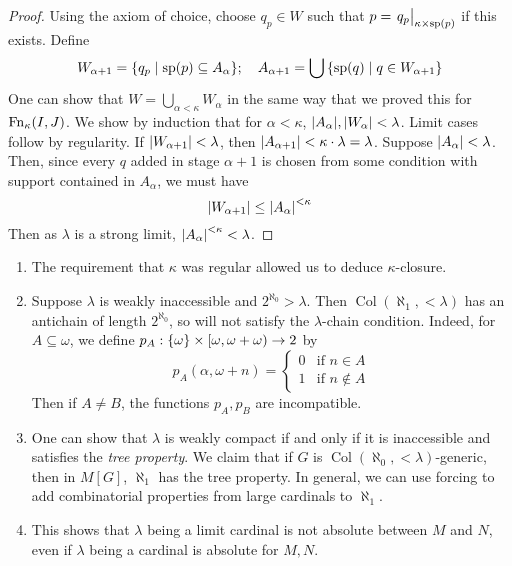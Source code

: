 \begin{proof}
    Using the axiom of choice, choose \( q_p \in W \) such that \( p = \eval{q_p}_{\kappa \times \operatorname{sp}(p)} \) if this exists.
    Define
    \[ W_{\alpha + 1} = \qty{q_p \mid \operatorname{sp}(p) \subseteq A_\alpha};\quad A_{\alpha + 1} = \bigcup\qty{\operatorname{sp}(q) \mid q \in W_{\alpha + 1}} \]
    One can show that \( W = \bigcup_{\alpha < \kappa} W_\alpha \) in the same way that we proved this for \( \operatorname{Fn}_\kappa(I, J) \).
    We show by induction that for \( \alpha < \kappa \), \( \abs{A_\alpha}, \abs{W_\alpha} < \lambda \).
    Limit cases follow by regularity.
    If \( \abs{W_{\alpha + 1}} < \lambda \), then \( \abs{A_{\alpha + 1}} < \kappa \cdot \lambda = \lambda \).
    Suppose \( \abs{A_{\alpha}} < \lambda \).
    Then, since every \( q \) added in stage \( \alpha + 1 \) is chosen from some condition with support contained in \( A_\alpha \), we must have
    \[ \abs{W_{\alpha + 1}} \leq \abs{A_\alpha}^{<\kappa} \]
    Then as \( \lambda \) is a strong limit, \( \abs{A_\alpha}^{<\kappa} < \lambda \).
\end{proof}
\begin{remark}
    \begin{enumerate}
        \item The requirement that \( \kappa \) was regular allowed us to deduce \( \kappa \)-closure.
        \item Suppose \( \lambda \) is weakly inaccessible and \( 2^{\aleph_0} > \lambda \).
        Then \( \operatorname{Col}(\aleph_1, <\lambda) \) has an antichain of length \( 2^{\aleph_0} \), so will not satisfy the \( \lambda \)-chain condition.
        Indeed, for \( A \subseteq \omega \), we define \( p_A : \qty{\omega} \times [\omega, \omega + \omega) \to 2 \) by
        \[ p_A(\alpha, \omega + n) = \begin{cases}
            0 & \text{if } n \in A \\
            1 & \text{if } n \notin A
        \end{cases} \]
        Then if \( A \neq B \), the functions \( p_A, p_B \) are incompatible.
        \item One can show that \( \lambda \) is weakly compact if and only if it is inaccessible and satisfies the \emph{tree property}.
        We claim that if \( G \) is \( \operatorname{Col}(\aleph_0, <\lambda) \)-generic, then in \( M[G] \), \( \aleph_1 \) has the tree property.
        In general, we can use forcing to add combinatorial properties from large cardinals to \( \aleph_1 \).
        \item This shows that \( \lambda \) being a limit cardinal is not absolute between \( M \) and \( N \), even if \( \lambda \) being a cardinal is absolute for \( M, N \).
    \end{enumerate}
\end{remark}
